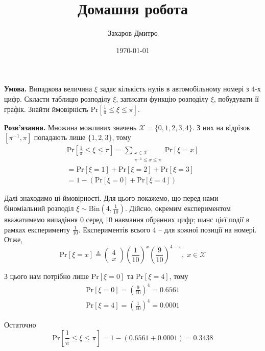 \documentclass[oneside,solution]{karazin-prob-theory-assign}
\title{Домашня робота}
\author{Захаров Дмитро}
\date{\today}
\begin{document}
\maketitle



\hspace{20px}\textbf{Умова.} Випадкова величина $\xi$ задає кількість нулів в автомобільному номері з 4-х цифр. Скласти таблицю розподілу $\xi$, записати функцію розподілу $\xi$, побудувати її графік. Знайти ймовірність $\text{Pr}\left[\frac{1}{\pi} \leq \xi \leq \pi \right]$.

\textbf{Розв'язання.} Множина можливих значень $\mathcal{X} = \{0,1,2,3,4\}$. З них на відрізок $[\pi^{-1},\pi]$ попадають лише $\{1,2,3\}$, тому
\begin{gather}
    \text{Pr}\left[\frac{1}{\pi} \leq \xi \leq \pi \right] = \sum_{\substack{x \in \mathcal{X} \\ \pi^{-1}\leq x \leq \pi}} \text{Pr}[\xi = x] \nonumber \\
    = \text{Pr}[\xi=1] + \text{Pr}[\xi=2] + \text{Pr}[\xi=3] \nonumber \\
    = 1 - (\text{Pr}[\xi=0] + \text{Pr}[\xi=4])
\end{gather}

Далі знаходимо ці ймовірності. Для цього покажемо, що перед нами біноміальний розподіл $\xi \sim \text{Bin}\left(4,\frac{1}{10}\right)$. Дійсно, окремим експериментом вважатимемо випадіння $0$ серед $10$ навмання обранних цифр; шанс цієї події в рамках експерименту $\frac{1}{10}$. Експериментів всього $4$ -- для кожної позиції на номері. Отже,
\begin{equation}
    \text{Pr}[\xi=x] \triangleq \begin{pmatrix}
        4 \\ x
    \end{pmatrix}\left(\frac{1}{10}\right)^x\left(\frac{9}{10}\right)^{4-x}, \; x \in \mathcal{X}
\end{equation}

З цього нам потрібно лише $\text{Pr}[\xi=0]$ та $\text{Pr}[\xi=4]$, тому
\begin{gather}
    \text{Pr}[\xi=0] = \left(\frac{9}{10}\right)^4 = 0.6561 \nonumber \\
    \text{Pr}[\xi=4] = \left(\frac{1}{10}\right)^4 = 0.0001
\end{gather}

Остаточно
\begin{equation}
    \text{Pr}\left[\frac{1}{\pi} \leq \xi \leq \pi\right] = 1 - (0.6561 + 0.0001) = \boxed{0.3438}
\end{equation}
\end{document}
